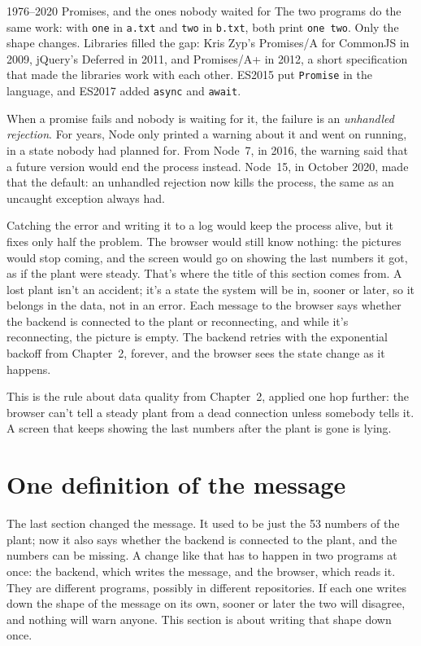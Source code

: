 \begin{history}{1976--2020 \textperiodcentered{} Promises, and the ones nobody waited for}
The two programs do the same work: with \texttt{one} in \texttt{a.txt} and
\texttt{two} in \texttt{b.txt}, both print \texttt{one two}. Only the shape
changes. Libraries filled the gap: Kris
Zyp's Promises/A for CommonJS in 2009, jQuery's Deferred in 2011, and
Promises/A+ in 2012, a short specification that made the libraries work with
each other. ES2015 put \texttt{Promise} in the language, and ES2017 added
\texttt{async} and \texttt{await}.

When a promise fails and nobody is waiting for it, the failure is an
\emph{unhandled rejection}. For years, Node only printed a warning about it and
went on running, in a state nobody had planned for. From Node~7, in 2016, the
warning said that a future version would end the process instead. Node~15, in October 2020, made
that the default: an unhandled rejection now kills the process, the same as an
uncaught exception always had.
\end{history}

Catching the error and writing it to a log would keep the process alive, but
it fixes only half the problem. The browser would still know nothing: the
pictures would stop coming, and the screen would go on showing the last numbers
it got, as if the plant were steady. That's where the title of this section
comes from. A lost plant isn't an accident; it's a state the system will be in,
sooner or later, so it belongs in the data, not in an error. Each message to
the browser says whether the backend is connected to the plant or
reconnecting, and while it's reconnecting, the picture is empty. The backend retries with the exponential
backoff from Chapter~2, forever, and the browser sees the state change as it
happens.

This is the rule about data quality from Chapter~2, applied one hop further:
the browser can't tell a steady plant from a dead connection unless somebody
tells it. A screen that keeps showing the last numbers after the plant is gone
is lying.

\section{One definition of the message}

The last section changed the message. It used to be just the 53 numbers of the
plant; now it also says whether the backend is connected to the plant, and the
numbers can be missing. A change like that has to happen in two programs at
once: the backend, which writes the message, and the browser, which reads it.
They are different programs, possibly in different repositories. If each one
writes down the shape of the message on its own, sooner or later the two will
disagree, and nothing will warn anyone. This section is about writing that shape
down once.

